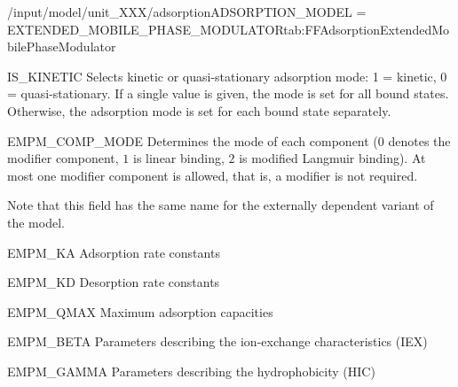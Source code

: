 \begin{condsubgroup}{/input/model/unit\_XXX/adsorption}{ADSORPTION\_MODEL = EXTENDED\_MOBILE\_PHASE\_MODULATOR}{tab:FFAdsorptionExtendedMobilePhaseModulator}
\begin{dataset}[type=int,range={$\{ 0,1 \}$},length={1 / \texttt{NTOTALBND}}]{IS\_KINETIC}
    Selects kinetic or quasi-stationary adsorption mode: 1 = kinetic, 0 = quasi-stationary.
    If a single value is given, the mode is set for all bound states.
    Otherwise, the adsorption mode is set for each bound state separately.
  \end{dataset}
  \begin{dataset}[type=int,range={$\{ 0,1,2 \}$},length={\texttt{NCOMP}}]{EMPM\_COMP\_MODE}
    Determines the mode of each component ($0$ denotes the modifier component, $1$ is linear binding, $2$ is modified Langmuir binding).
    At most one modifier component is allowed, that is, a modifier is not required.

    Note that this field has the same name for the externally dependent variant of the model.
  \end{dataset}
  \begin{dataset}[unit=\si{\cubic\metre\of{MP}\per\mol\per\second}, type=double,range={$\geq 0$},length={\texttt{NCOMP}}]{EMPM\_KA}
    Adsorption rate constants
  \end{dataset}
  \begin{dataset}[unit=\si{\raiseto{3\beta}\metre\of{MP}\per\raiseto{\beta}\mol\per\second}, type=double,range={$\geq 0$},length={\texttt{NCOMP}}]{EMPM\_KD}
    Desorption rate constants
  \end{dataset}
  \begin{dataset}[unit=\si{\mol\per\cubic\metre\of{SP}}, type=double,range={$\geq 0$},length={\texttt{NCOMP}}]{EMPM\_QMAX}
    Maximum adsorption capacities
  \end{dataset}
  \begin{dataset}[unit=\si{\mol\per\cubic\metre\of{SP}}, type=double,range={$\geq 0$},length={\texttt{NCOMP}}]{EMPM\_BETA}
    Parameters describing the ion-exchange characteristics (IEX)
  \end{dataset}
  \begin{dataset}[unit=\si{\cubic\metre\of{MP}\per\mol}, type=double,range={$\geq 0$},length={\texttt{NCOMP}}]{EMPM\_GAMMA}
    Parameters describing the hydrophobicity (HIC)
  \end{dataset}
\end{condsubgroup}

